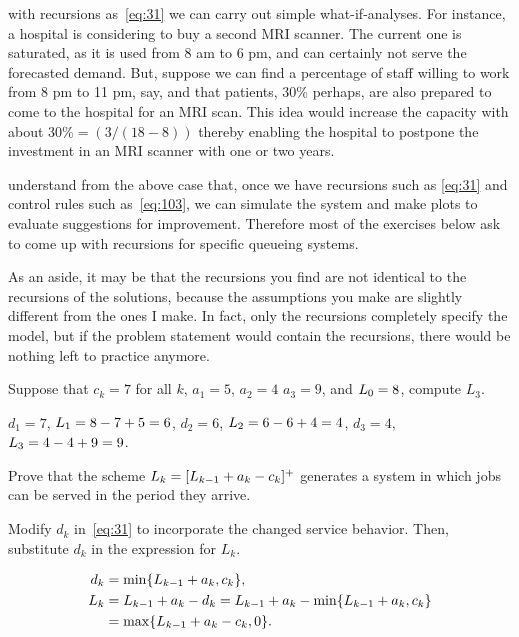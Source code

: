  with recursions as~\cref{eq:31} we can carry out simple what-if-analyses.
For instance, a hospital is considering to buy a second MRI scanner.
The current one is saturated, as it is used from 8 am to 6 pm, and can certainly not serve the forecasted demand.
But, suppose we can find a percentage of staff willing to work from 8 pm to 11 pm, say, and that patients, 30\% perhaps, are also prepared to come to the hospital for an MRI scan.
This idea would increase the capacity with about $30\% = (3/(18-8))$ thereby enabling the hospital to postpone the investment in an MRI scanner with one or two years.



 understand from the above case that, once we have recursions such as \cref{eq:31} and control rules such as~\cref{eq:103}, we can simulate the system and make plots to evaluate suggestions for improvement. Therefore most  of the exercises below ask to come up with recursions for specific queueing systems.

As an aside, it may be that the recursions you find are not identical to the recursions of the solutions, because the assumptions you make are slightly different from the ones I make.
In fact, only the recursions completely specify the model, but if the problem statement would contain the recursions, there would be nothing left to practice anymore.


\begin{exercise}\label{ex:58}
 Suppose that $c_k= 7$ for all $k$, $a_1=5$, $a_2=4$ $a_3=9$, and $L_0=8$, compute $L_3$.
\begin{solution}
$d_1=7$, $L_1=8-7+5=6$, $d_2 = 6$, $L_2=6-6+4=4$, $d_3 = 4$, $L_3=4-4+9=9$.
\end{solution}
\end{exercise}



\begin{exercise}\label{ex:24}
Prove  that the scheme
$L_k = [L_{k-1}+a_k - c_k]^+$
generates a system in which jobs can be served in the period they arrive.
\begin{hint}
  Modify $d_k$ in~\cref{eq:31} to incorporate the changed service behavior.
  Then, substitute $d_k$ in the expression for $L_k$.
\end{hint}
\begin{solution}
 \begin{align*}
 d_k &= \min\{L_{k-1}+a_k, c_k\}, \\
 L_k &= L_{k-1} + a_k - d_k  = L_{k-1} + a_k - \min\{L_{k-1}+a_k, c_k\} \\
 &= \max\{L_{k-1} + a_k - c_k, 0 \}.
 \end{align*}
\end{solution}
\end{exercise}



